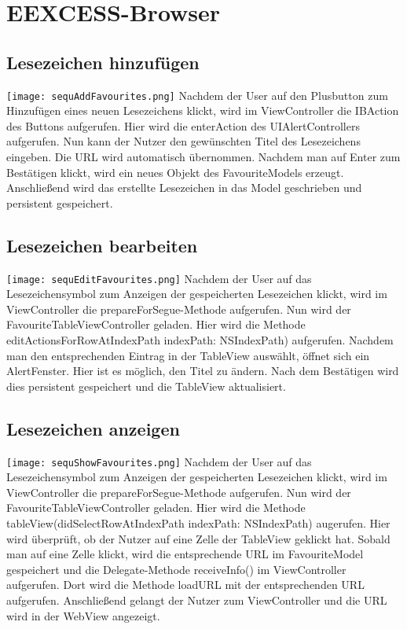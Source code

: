 \chapter{EEXCESS-Browser}

\section{Lesezeichen hinzufügen}
\texttt{[image: sequAddFavourites.png]}
Nachdem der User auf den Plusbutton zum Hinzufügen eines neuen Lesezeichens klickt, wird im ViewController die IBAction des Buttons aufgerufen. Hier wird die enterAction des UIAlertControllers aufgerufen. Nun kann der Nutzer den gewünschten Titel des Lesezeichens eingeben. Die URL wird automatisch übernommen. Nachdem man auf Enter zum Bestätigen klickt, wird ein neues Objekt des FavouriteModels erzeugt. Anschließend wird das erstellte Lesezeichen in das Model geschrieben und persistent gespeichert.
\pagebreak

\section{Lesezeichen bearbeiten}
\texttt{[image: sequEditFavourites.png]}
Nachdem der User auf das Lesezeichensymbol zum Anzeigen der gespeicherten Lesezeichen klickt, wird im ViewController die prepareForSegue-Methode aufgerufen. Nun wird der FavouriteTableViewController geladen. Hier wird die Methode editActionsForRowAtIndexPath indexPath: NSIndexPath) aufgerufen. Nachdem man den entsprechenden Eintrag in der TableView auswählt, öffnet sich ein AlertFenster. Hier ist es möglich, den Titel zu ändern. Nach dem Bestätigen wird dies persistent gespeichert und die TableView aktualisiert.
\pagebreak

\section{Lesezeichen anzeigen}
\texttt{[image: sequShowFavourites.png]}
Nachdem der User auf das Lesezeichensymbol zum Anzeigen der gespeicherten Lesezeichen klickt, wird im ViewController die prepareForSegue-Methode aufgerufen. Nun wird der FavouriteTableViewController geladen. Hier wird die Methode tableView(didSelectRowAtIndexPath indexPath: NSIndexPath) augerufen. Hier wird überprüft, ob der Nutzer auf eine Zelle der TableView geklickt hat. Sobald man auf eine Zelle klickt, wird die entsprechende URL im FavouriteModel gespeichert und die Delegate-Methode receiveInfo() im ViewController aufgerufen. Dort wird die Methode loadURL mit der entsprechenden URL aufgerufen. Anschließend gelangt der Nutzer zum ViewController und die URL wird in der WebView angezeigt.
\pagebreak

